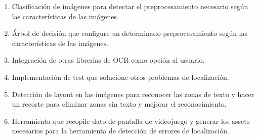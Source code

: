\begin{enumerate}
	\item Clasificación de imágenes para detectar el preprocesamiento necesario según las características de las imágenes.
	\item Árbol de decisión que configure un determinado preprocesamiento según las características de las imágenes.
	\item Integración de otras librerías de OCR como opción al usuario.
	\item Implementación de test que solucione otros problemas de localización.
	\item Detección de layout en las imágenes para reconocer las zonas de texto y hacer un recorte para eliminar zonas sin texto y mejorar el reconocimiento.
	\item Herramienta que recopile dato de pantalla de videojuego y generar los assets necesarios para la herramienta de detección de errores de localización.
\end{enumerate}
